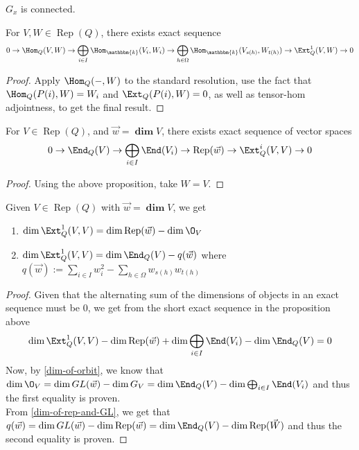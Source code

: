 \documentclass[11pt,leqno,oneside]{amsbook}
\numberwithin{thm}{section}
\newcommand{\bbk}{\mathbbm{k}} %
\newcommand{\Rep}{\operatorname{Rep}} %
\renewcommand{\Q}{Q} %
\newcommand{\grdim}{\boldsymbol{\dim}} %
\begin{document}
\begin{prop}
  \(G_x\) is connected.
\end{prop}
\begin{prop}
   For \(V,W \in \Rep(\Q)\), there exists exact sequence \[
    0 \to \Hom_\Q(V,W) \to \bigoplus_{i \in I} \Hom_\bbk (V_i,W_i) \to
    \bigoplus_{h \in \Omega} \Hom_\bbk(V_{s(h)}, W_{t(h)}) \to
    \Ext_Q^1(V,W) \to 0
  \]
\end{prop}
\begin{proof}
  Apply \(\Hom_\Q(-,W)\) to the standard
  resolution, use the fact that \(\Hom_\Q(P(i),W) = W_i\) and
  \(\Ext_\Q(P(i),W) = 0\), as well as tensor-hom adjointness, to get
  the final result. 
\end{proof}
\begin{cor}
  For \(V \in \Rep(\Q)\), and \(\vec{w} = \grdim V\), there exists
  exact sequence of vector spaces \[
    0 \to \End_\Q(V) \to \bigoplus_{i \in I} \End(V_i) \to \Rep(\vec{w}) \to \Ext_\Q^i(V,V) \to 0
  \]
\end{cor}
\begin{proof}
  Using the above proposition, take \(W=V\). 
\end{proof}
\begin{prop}\label{dim-of-ext-vv}
  Given \(V \in \Rep(\Q)\) with \(\vec{w} = \grdim V\), we get
  \begin{enumerate}
  \item \(\dim \Ext_Q^1(V,V) = \dim \Rep(\vec{w}) - \dim \O_V\)
  \item \(\dim \Ext_Q^1(V,V) = \dim \End_Q(V) - q(\vec{w})\) where
    \(q(\vec{w}) := \sum_{i \in I} w_i^2 - \sum_{h \in \Omega}
    w_{s(h)} w_{t(h)} \)
  \end{enumerate}
\end{prop}
\begin{proof}
  Given that the alternating sum of the dimensions of objects in an
  exact sequence must be 0, we get from the short exact sequence in
  the proposition above \[
    \dim \Ext_Q^1(V,V) - \dim \Rep(\vec{w}) + \dim \bigoplus_{i \in
      I} \End(V_i) - \dim \End_\Q(V) = 0
  \]
  Now, by \ref{dim-of-orbit}, we know that \(\dim \O_V = \dim
  GL(\vec{w}) - \dim G_V = \dim \End_\Q(V) - \dim \bigoplus_{i \in
    I} \End(V_i)\)  and thus the
  first equality is proven. \\

  From \ref{dim-of-rep-and-GL}, we get that \(q(\vec{w}) = \dim
  GL(\vec{w}) - \dim \Rep(\vec{w}) = \dim \End_\Q(V) - \dim
  \Rep(\vec{W})\) and thus the second equality is proven. 
\end{proof}
\end{document}
